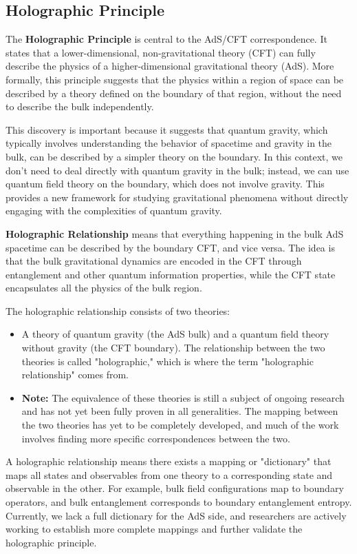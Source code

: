 \documentclass[12pt]{article}
\begin{document}
    \subsection{Holographic Principle}
        The \textbf{Holographic Principle} is central to the AdS/CFT correspondence. It states that a lower-dimensional, non-gravitational theory (CFT) can fully describe the physics of a higher-dimensional gravitational theory (AdS). More formally, this principle suggests that the physics within a region of space can be described by a theory defined on the boundary of that region, without the need to describe the bulk independently.

        This discovery is important because it suggests that quantum gravity, which typically involves understanding the behavior of spacetime and gravity in the bulk, can be described by a simpler theory on the boundary. In this context, we don't need to deal directly with quantum gravity in the bulk; instead, we can use quantum field theory on the boundary, which does not involve gravity. This provides a new framework for studying gravitational phenomena without directly engaging with the complexities of quantum gravity. 

        \textbf{Holographic Relationship} means that everything happening in the bulk AdS spacetime can be described by the boundary CFT, and vice versa. The idea is that the bulk gravitational dynamics are encoded in the CFT through entanglement and other quantum information properties, while the CFT state encapsulates all the physics of the bulk region.

        The holographic relationship consists of two theories:
        \begin{itemize}
            \item A theory of quantum gravity (the AdS bulk) and a quantum field theory without gravity (the CFT boundary). The relationship between the two theories is called "holographic," which is where the term "holographic relationship" comes from.
            \item \textbf{Note:} The equivalence of these theories is still a subject of ongoing research and has not yet been fully proven in all generalities. The mapping between the two theories has yet to be completely developed, and much of the work involves finding more specific correspondences between the two.
        \end{itemize}

        A holographic relationship means there exists a mapping or "dictionary" that maps all states and observables from one theory to a corresponding state and observable in the other. For example, bulk field configurations map to boundary operators, and bulk entanglement corresponds to boundary entanglement entropy. Currently, we lack a full dictionary for the AdS side, and researchers are actively working to establish more complete mappings and further validate the holographic principle.
\end{document}
